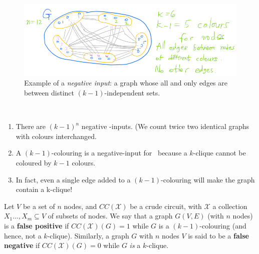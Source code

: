 \begin{description}
\begin{figure}[H]
    \centering
    \includegraphics[width=.6\linewidth]{images/clique2.png}
    \caption{Example of a \emph{negative input}: a graph whose all and only edges are between distinct $(k-1)$-independent sets.}
    \label{fig:enter-label}
\end{figure}

\end{description}

\begin{note}\

\begin{enumerate}
\item There are $(k-1)^n$ negative -inputs. (We count twice two identical graphs with colours interchanged.

\item 
 A $(k-1)$-colouring is a negative-input for \cliquenk\ because a $k$-clique cannot be coloured by $k-1$ colours.
\item
 In fact, even a single edge added to a $(k-1)$-colouring will make the graph contain a k-clique!
\end{enumerate}
\end{note}


Let $V$ be a set of $n$ nodes, and  $CC(\mathcal X)$ be a   crude circuit, with  $\mathcal X$ a collection $X_1\dots,X_m\subseteq V$ of subsets of nodes. We say that  a graph $G(V,E)$ (with $n$ nodes) is a \textbf{false positive} if $CC(\mathcal X)(G)=1$ while $G$ is  a $(k-1)$-colouring (and hence, not a $k$-clique). Similarly, a graph $G$ with $n$ nodes $V$ is said to be a \textbf{false negative} if $CC(\mathcal X)(G)=0$ while $G$ \emph{is} a $k$-clique.







